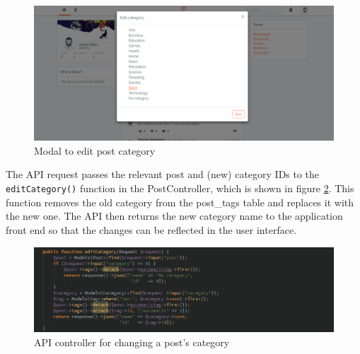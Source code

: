 \begin{figure}[H]
\centering
\includegraphics[width=\textwidth]{Images/Implementation/category-modal}
\caption{Modal to edit post category}
\label{fig:category-modal}
\end{figure}

The API request passes the relevant post and (new) category IDs to the \texttt{editCategory()} function in the PostController, which is shown in figure \ref{fig:edit-category}. This function removes the old category from the post\_tags table and replaces it with the new one. The API then returns the new category name to the application front end so that the changes can be reflected in the user interface. 

\begin{figure}[H]
\centering
\includegraphics[width=\textwidth]{Images/Implementation/edit-category}
\caption{API controller for changing a post's category}
\label{fig:edit-category}
\end{figure}

